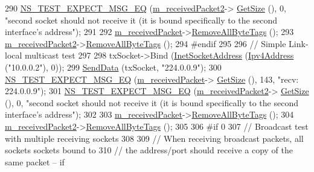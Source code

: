 \begin{DoxyCode}
290   \hyperlink{group__testing_ga7304ba46a28d8cf08dfdfd6499cf7068}{NS\_TEST\_EXPECT\_MSG\_EQ} (\hyperlink{classIpv4RawSocketImplTest_a52607bc760ccb25a084978830b95d162}{m\_receivedPacket2}->
      \hyperlink{classns3_1_1Packet_a462855c9929954d4301a4edfe55f4f1c}{GetSize} (), 0, \textcolor{stringliteral}{"second socket should not receive it (it is bound specifically to the second
       interface's address"});
291 
292   \hyperlink{classIpv4RawSocketImplTest_a38dee32030c77d03c740508d0a68bd22}{m\_receivedPacket}->\hyperlink{classns3_1_1Packet_a083f54c9db31aeff30551a9e20fcda42}{RemoveAllByteTags} ();
293   \hyperlink{classIpv4RawSocketImplTest_a52607bc760ccb25a084978830b95d162}{m\_receivedPacket2}->\hyperlink{classns3_1_1Packet_a083f54c9db31aeff30551a9e20fcda42}{RemoveAllByteTags} ();
294 \textcolor{preprocessor}{#endif}
295 
296   \textcolor{comment}{// Simple Link-local multicast test}
297 
298   txSocket->Bind (\hyperlink{classns3_1_1InetSocketAddress}{InetSocketAddress} (\hyperlink{classns3_1_1Ipv4Address}{Ipv4Address} (\textcolor{stringliteral}{"10.0.0.2"}), 0));
299   \hyperlink{classIpv4RawSocketImplTest_a62c6104203d0fb2f7688ac216f0d5218}{SendData} (txSocket, \textcolor{stringliteral}{"224.0.0.9"});
300   \hyperlink{group__testing_ga7304ba46a28d8cf08dfdfd6499cf7068}{NS\_TEST\_EXPECT\_MSG\_EQ} (\hyperlink{classIpv4RawSocketImplTest_a38dee32030c77d03c740508d0a68bd22}{m\_receivedPacket}->
      \hyperlink{classns3_1_1Packet_a462855c9929954d4301a4edfe55f4f1c}{GetSize} (), 143, \textcolor{stringliteral}{"recv: 224.0.0.9"});
301   \hyperlink{group__testing_ga7304ba46a28d8cf08dfdfd6499cf7068}{NS\_TEST\_EXPECT\_MSG\_EQ} (\hyperlink{classIpv4RawSocketImplTest_a52607bc760ccb25a084978830b95d162}{m\_receivedPacket2}->
      \hyperlink{classns3_1_1Packet_a462855c9929954d4301a4edfe55f4f1c}{GetSize} (), 0, \textcolor{stringliteral}{"second socket should not receive it (it is bound specifically to the second
       interface's address"});
302 
303   \hyperlink{classIpv4RawSocketImplTest_a38dee32030c77d03c740508d0a68bd22}{m\_receivedPacket}->\hyperlink{classns3_1_1Packet_a083f54c9db31aeff30551a9e20fcda42}{RemoveAllByteTags} ();
304   \hyperlink{classIpv4RawSocketImplTest_a52607bc760ccb25a084978830b95d162}{m\_receivedPacket2}->\hyperlink{classns3_1_1Packet_a083f54c9db31aeff30551a9e20fcda42}{RemoveAllByteTags} ();
305 
306 \textcolor{preprocessor}{#if 0}
307   \textcolor{comment}{// Broadcast test with multiple receiving sockets}
308 
309   \textcolor{comment}{// When receiving broadcast packets, all sockets sockets bound to}
310   \textcolor{comment}{// the address/port should receive a copy of the same packet -- if}

\end{DoxyCode}

